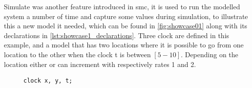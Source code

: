 \begin{table}[]
	\centering
	\caption{Results from Pr[<=1](<> Process.L4) with different parameter settings}
	\label{table:smc_result}
\end{table}

Simulate was another feature introduced in \gls{smc}, it is used to run the modelled system a number of time and capture some values during simulation, to illustrate this a new model it needed, which can be found in \cref{fig:showcase01} along with its declarations in \cref{lst:showcase1_declarations}. Three clock are defined in this example, and a model that has two locations where it is possible to go from one location to the other when the clock t is between $[5-10]$. Depending on the location either  or  can increment with respectively rates 1 and 2.

\begin{figure}[H]
	\begin{lstlisting}[language=my_c, caption={Declarations}, label=lst:showcase1_declarations]
	clock x, y, t;
	\end{lstlisting}
\end{figure}

